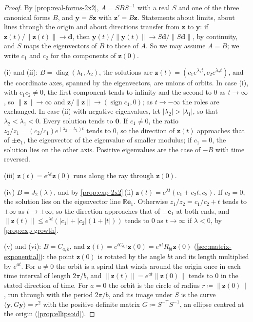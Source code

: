 \begin{proof}
By \cref{prop:real-forms-2x2}, $A=SBS^{-1}$ with a real $S$ and one of the three canonical forms $B$, and $\mathbf y=S\mathbf z$ with $\mathbf z'=B\mathbf z$. Statements about limits, about lines through the origin and about directions transfer from $\mathbf z$ to $\mathbf y$: if $\mathbf z(t)/\|\mathbf z(t)\|\to\mathbf d$, then $\mathbf y(t)/\|\mathbf y(t)\|\to S\mathbf d/\|S\mathbf d\|$, by continuity, and $S$ maps the eigenvectors of $B$ to those of $A$. So we may assume $A=B$; we write $c_1$ and $c_2$ for the components of $\mathbf z(0)$.

(i) and (ii): $B=\operatorname{diag}(\lambda_1,\lambda_2)$, the solutions are $\mathbf z(t)=(c_1e^{\lambda_1t},c_2e^{\lambda_2t})$, and the coordinate axes, spanned by the eigenvectors, are unions of orbits. In case (i), with $c_1c_2\ne0$, the first component tends to infinity and the second to $0$ as $t\to\infty$, so $\|\mathbf z\|\to\infty$ and $\mathbf z/\|\mathbf z\|\to(\operatorname{sign}c_1,0)$; as $t\to-\infty$ the roles are exchanged. In case (ii) with negative eigenvalues, let $|\lambda_2|>|\lambda_1|$, so that $\lambda_2<\lambda_1<0$. Every solution tends to $\mathbf 0$. If $c_1\ne0$, the ratio $z_2/z_1=(c_2/c_1)e^{(\lambda_2-\lambda_1)t}$ tends to $0$, so the direction of $\mathbf z(t)$ approaches that of $\pm\mathbf e_1$, the eigenvector of the eigenvalue of smaller modulus; if $c_1=0$, the solution lies on the other axis. Positive eigenvalues are the case of $-B$ with time reversed.

(iii) $\mathbf z(t)=e^{\lambda t}\mathbf z(0)$ runs along the ray through $\mathbf z(0)$.

(iv) $B=J_2(\lambda)$, and by \cref{prop:exp-2x2}\,(ii) $\mathbf z(t)=e^{\lambda t}(c_1+c_2t,c_2)$. If $c_2=0$, the solution lies on the eigenvector line $\mathbb R\mathbf e_1$. Otherwise $z_1/z_2=c_1/c_2+t$ tends to $\pm\infty$ as $t\to\pm\infty$, so the direction approaches that of $\pm\mathbf e_1$ at both ends, and $\|\mathbf z(t)\|\le e^{\lambda t}(|c_1|+|c_2|(1+|t|))$ tends to $0$ as $t\to\infty$ if $\lambda<0$, by \cref{prop:exp-growth}.

(v) and (vi): $B=C_{a,b}$, and $\mathbf z(t)=e^{tC_{a,b}}\mathbf z(0)=e^{at}R_{bt}\mathbf z(0)$ (\cref{sec:matrix-exponential}): the point $\mathbf z(0)$ is rotated by the angle $bt$ and its length multiplied by $e^{at}$. For $a\ne0$ the orbit is a spiral that winds around the origin once in each time interval of length $2\pi/b$, and $\|\mathbf z(t)\|=e^{at}\|\mathbf z(0)\|$ tends to $0$ in the stated direction of time. For $a=0$ the orbit is the circle of radius $r\coloneqq\|\mathbf z(0)\|$, run through with the period $2\pi/b$, and its image under $S$ is the curve $\langle\mathbf y,G\mathbf y\rangle=r^2$ with the positive definite matrix $G\coloneqq S^{-\mathsf T}S^{-1}$, an ellipse centred at the origin (\cref{prop:ellipsoid}).
\end{proof}

